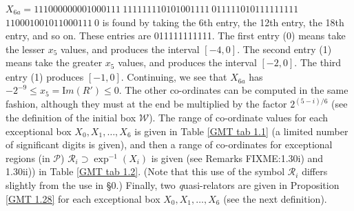 \noindent 
$X_{6a} = 
111000000001000111\ 
111111110101001111\ 
011111010111111111$\hfill
{}
  \hfill $  
110001001011000111\ 0$
\vglue4pt\noindent 
is found by taking the 6th entry, the 12th entry, the 18th entry, and so on.  These entries are 011111111111.  The first entry (0) means take the
lesser $x_5$ values, and produces the interval $[-4,0].$  The second entry (1) means take the greater $x_5$ values, and produces the interval
$[-2,0].$  The third entry (1) produces $[-1,0].$  Continuing, we see that $X_{6a}^{\phantom{|}}$ has $-2^{-9} \le x_5 = {\mathrm Im}(R') \le 0.$  The other
co-ordinates can be computed in the same fashion, although they must at the end be multiplied by the factor $2^{(5 - i)/6}$ (see the definition of the
initial box
${\mathcal W}$).  The range of co-ordinate values for each  exceptional  box $X_0, X_1, \ldots, X_6$ is given in Table \ref{GMT tab 1.1} (a limited number of significant
digits is given), and  then a range of co-ordinates for exceptional regions (in ${\mathcal P}$) 
${\mathcal R}_i \supset \exp^{-1}(X_i)$ is given (see Remarks FIXME:1.30i) and 1.30ii)) in Table \ref{GMT tab 1.2}. (Note that this use of the symbol ${\mathcal R}_i$ differs
slightly from the use in \S 0.)
Finally, two {\textit quasi-relators} are given in Proposition \ref{GMT 1.28} for each exceptional box $X_0, X_1, \ldots, X_6$ (see the next definition).
 
